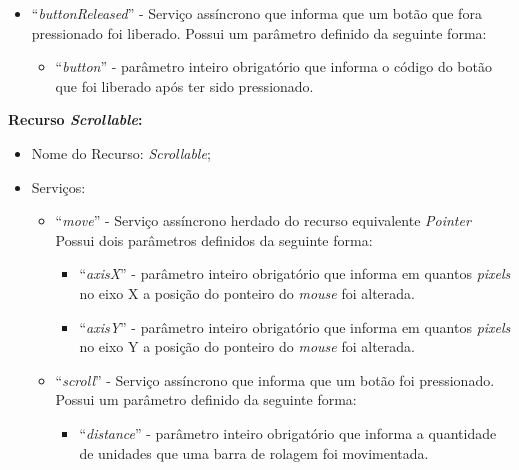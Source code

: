 \begin{itemize}
\begin{itemize}
			\item ``\emph{buttonReleased}'' - Serviço assíncrono que informa que um botão que fora pressionado foi liberado. Possui um parâmetro definido da seguinte forma:

				\begin{itemize}
					\item ``\emph{button}'' - parâmetro inteiro obrigatório que informa o código do botão que foi liberado após ter sido pressionado.
				\end{itemize}

		\end{itemize}
\end{itemize}

\textbf{Recurso \emph{Scrollable}:}

\begin{itemize}
	
	\item Nome do Recurso: \emph{Scrollable};

	\item Serviços:
		
		\begin{itemize}

			\item ``\emph{move}'' - Serviço assíncrono herdado do recurso equivalente \emph{Pointer} Possui dois parâmetros definidos da seguinte forma:

				\begin{itemize}
					\item ``\emph{axisX}'' - parâmetro inteiro obrigatório que informa em quantos \emph{pixels} no eixo X a posição do ponteiro do \emph{mouse} foi alterada.

					\item ``\emph{axisY}'' - parâmetro inteiro obrigatório que informa em quantos \emph{pixels} no eixo Y a posição do ponteiro do \emph{mouse} foi alterada.
				\end{itemize}
			
			\item ``\emph{scroll}'' - Serviço assíncrono que informa que um botão foi pressionado. Possui um parâmetro definido da seguinte forma:

				\begin{itemize}
					\item ``\emph{distance}'' - parâmetro inteiro obrigatório que informa a quantidade de unidades que uma barra de rolagem foi movimentada.
				\end{itemize}

		\end{itemize}
\end{itemize}

